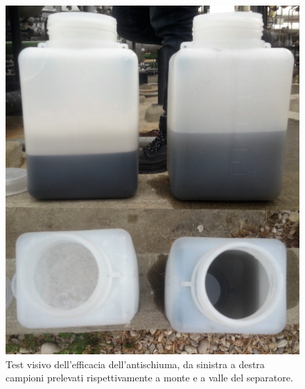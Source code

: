 \begin{figure}[htbp]
    \centering
    \includegraphics[width=.5\textwidth]{fig/test/defoamer-confronto}
    \caption{Test visivo dell'efficacia dell'antischiuma, da sinistra a destra campioni prelevati rispettivamente a monte e a valle del separatore.} 
    \label{fig:defoamer-confronto}
\end{figure}

